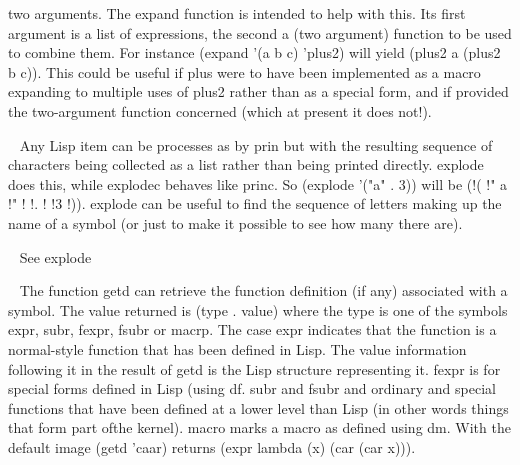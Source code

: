 \begin{description}
two arguments. The {\tx expand} function is intended to help with this. Its
first argument is a list of expressions, the second a (two argument) function
to be used to combine them. For instance {\tx (expand '(a b c) 'plus2)} will
yield {\tx (plus2 a (plus2 b c))}. This could be useful if {\tx plus} were
to have been implemented as a macro expanding to multiple uses of {\tx plus2}
rather than as a special form, and if \vsl{} provided the two-argument
function concerned (which at present it does not!).
\item[{\tx explode~~~~~~} \hspace{1cm} {\em function 1 arg}]~\newline
Any Lisp item can be processes as by {\tx prin} but with the resulting sequence
of characters being collected as a list rather than being printed directly.
{\tx explode} does this, while {\tx explodec} behaves like {\tx princ}. So
{\tx (explode '("a" . 3))} will be {\tx (!( !" a !" !  !. !  !3 !))}.
{\tx explode} can be useful to find the sequence of letters making up the name
of a symbol (or just to make it possible to see how many there are).
\item[{\tx explodec~~~~~} \hspace{1cm} {\em function 1 arg}]~\newline
See {\tx explode}
\item[{\tx expr~~~~~~~~~} \hspace{1cm} {\em symbol}]~\newline
The function {\tx getd} can retrieve the function definition (if any) associated
with a symbol. The value returned is {\tx (type . value)} where the {\tx type}
is one of the symbols {\tx expr}, {\tx subr}, {\tx fexpr}, {\tx fsubr} or
{\tx macrp}. The case {\tx expr} indicates that the function is a normal-style
function that has been defined in Lisp. The value information following it
in the result of {\tx getd} is the Lisp structure representing it. {\tx fexpr}
is for special forms defined in Lisp (using {\tx df}. {\tx subr} and {\tx fsubr}
and ordinary and special functions that have been defined at a lower level than
Lisp (in other words things that form part ofthe \vsl{} kernel). {\tx macro}
marks a macro as defined using {\tx dm}. With the default
\vsl{} image {\tx (getd 'caar)} returns {\tx (expr lambda (x) (car (car x)))}.
\item[{\tx f~~~~~~~~~~~~} \hspace{1cm} {\em predefined variable}]~\newline

\end{description}
